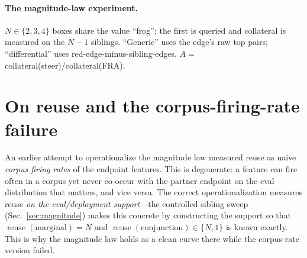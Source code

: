\documentclass[11pt]{article}
\newcommand{\reuse}{\operatorname{reuse}}
\theoremstyle{definition}
\theoremstyle{plain}
\theoremstyle{remark}
\begin{document}
\paragraph{The magnitude-law experiment.} $N\in\{2,3,4\}$ boxes share the value ``frog''; the first is queried and collateral is measured on the $N-1$ siblings. ``Generic'' uses the edge's raw top pairs; ``differential'' uses red-edge-minus-sibling-edges. $A=$ collateral(steer)/collateral(FRA).

\section{On reuse and the corpus-firing-rate failure}\label{sec:s5}

An earlier attempt to operationalize the magnitude law measured reuse as naive \emph{corpus firing rates} of the endpoint features. This is degenerate: a feature can fire often in a corpus yet never co-occur with the partner endpoint on the eval distribution that matters, and vice versa. The correct operationalization measures reuse \emph{on the eval/deployment support}---the controlled sibling sweep (Sec.~\ref{sec:magnitude}) makes this concrete by constructing the support so that $\reuse(\text{marginal})=N$ and $\reuse(\text{conjunction})\in\{N,1\}$ is known exactly. This is why the magnitude law holds as a clean curve there while the corpus-rate version failed.
\end{document}
